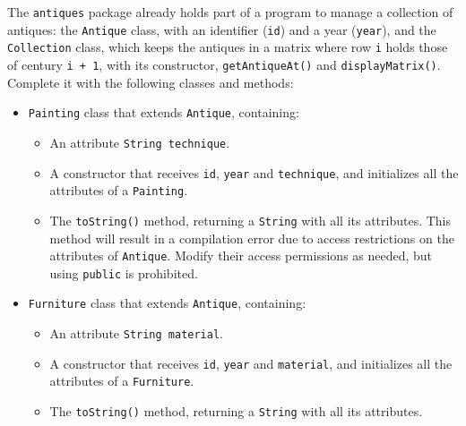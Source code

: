 The \texttt{antiques} package already holds part of a program to manage a collection of antiques: the \texttt{Antique} class, with an identifier (\texttt{id}) and a year (\texttt{year}), and the \texttt{Collection} class, which keeps the antiques in a matrix where row \texttt{i} holds those of century \texttt{i + 1}, with its constructor, \texttt{getAntiqueAt()} and \texttt{displayMatrix()}. Complete it with the following classes and methods:

\begin{itemize}

    \item \texttt{Painting} class that extends \texttt{Antique}, containing:

        \begin{itemize}

            \item An attribute \texttt{String technique}.

            \item A constructor that receives \texttt{id}, \texttt{year} and \texttt{technique}, and initializes all the attributes of a \texttt{Painting}.

            \item The \texttt{toString()} method, returning a \texttt{String} with all its attributes. This method will result in a compilation error due to access restrictions on the attributes of \texttt{Antique}. Modify their access permissions as needed, but using \texttt{public} is prohibited.

        \end{itemize}

    \item \texttt{Furniture} class that extends \texttt{Antique}, containing:

        \begin{itemize}

            \item An attribute \texttt{String material}.

            \item A constructor that receives \texttt{id}, \texttt{year} and \texttt{material}, and initializes all the attributes of a \texttt{Furniture}.

            \item The \texttt{toString()} method, returning a \texttt{String} with all its attributes.

        \end{itemize}


\end{itemize}
